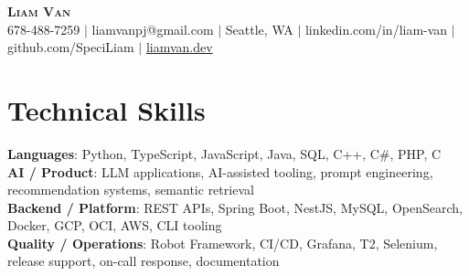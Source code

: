 \documentclass[letterpaper,11pt]{article}
\begin{document}

%
\begin{center}
    \textbf{\Huge \scshape Liam Van} \\ \vspace{1pt}
    \small 678-488-7259 $|$ \small {liamvanpj@gmail.com} $|$ Seattle, WA
 {{$|$ linkedin.com/in/liam-van} {$|$ github.com/SpeciLiam} {$|$ \href{https://liamvan.dev}{liamvan.dev}}}

\end{center}

\section{Technical Skills}
 \begin{itemize}[leftmargin=0.15in, label={}]
    \small{\item{
     \textbf{Languages}{: Python, TypeScript, JavaScript, Java, SQL, C++, C\#, PHP, C} \\
     \textbf{AI / Product}{: LLM applications, AI-assisted tooling, prompt engineering, recommendation systems, semantic retrieval} \\
     \textbf{Backend / Platform}{: REST APIs, Spring Boot, NestJS, MySQL, OpenSearch, Docker, GCP, OCI, AWS, CLI tooling} \\
     \textbf{Quality / Operations}{: Robot Framework, CI/CD, Grafana, T2, Selenium, release support, on-call response, documentation} \\
    }}
 \end{itemize}
%
\end{document}
